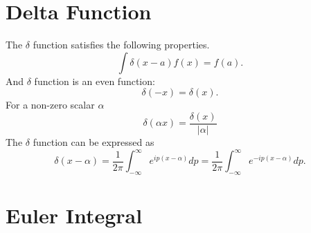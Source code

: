 \documentclass{book}
\numberwithin{equation}{section}
\begin{document}
\section{Delta Function}
The $\delta$ function satisfies the following properties.
\begin{equation}
  \int\delta(x-a) f(x)=f(a).
\end{equation}
And $\delta$ function is an even function:
\begin{equation}
  \delta(-x)=\delta(x).
\end{equation}
For a non-zero scalar $\alpha$
\begin{equation}
  \delta(\alpha x)=\frac{\delta(x)}{|\alpha|}
\end{equation}
The $\delta$ function can be expressed as
\begin{equation}
  \delta(x-\alpha)=\frac{1}{2\pi}\int_{-\infty}^\infty e^{ip(x-\alpha)}dp=
  \frac{1}{2\pi}\int_{-\infty}^\infty e^{-ip(x-\alpha)}dp.
\end{equation}

\section{Euler Integral}
\end{document}
